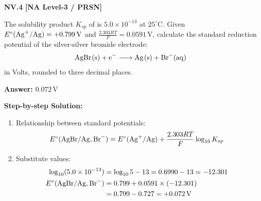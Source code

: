 \begin{problembox}
\textbf{NV.4} \hfill \textbf{[NA Level-3 / PRSN]}

The solubility product $K_{sp}$ of  is $5.0 \times 10^{-13}$ at $25^\circ\text{C}$. Given $E^\circ(\ce{Ag+/Ag}) = +0.799\,\text{V}$ and $\frac{2.303 RT}{F} = 0.0591\,\text{V}$, calculate the standard reduction potential of the silver-silver bromide electrode:
\begin{equation*}
    \ce{AgBr(s) + e^- -> Ag(s) + Br^-(aq)}
\end{equation*}
in Volts, rounded to three decimal places.
\end{problembox}
\begin{solution}
\textbf{Answer: $0.072\,\text{V}$}

\textbf{Step-by-step Solution:}
\begin{enumerate}
    \item Relationship between standard potentials:
    \begin{equation*}
        E^\circ(\ce{AgBr/Ag, Br^-}) = E^\circ(\ce{Ag+/Ag}) + \frac{2.303 RT}{F} \log_{10} K_{sp}
    \end{equation*}
    \item Substitute values:
    \begin{align*}
        \log_{10}(5.0 \times 10^{-13}) &= \log_{10} 5 - 13 = 0.6990 - 13 = -12.301 \\
        E^\circ(\ce{AgBr/Ag, Br^-}) &= 0.799 + 0.0591 \times (-12.301) \\
        &= 0.799 - 0.727 = +0.072\,\text{V}
    \end{align*}
\end{enumerate}
\end{solution}

